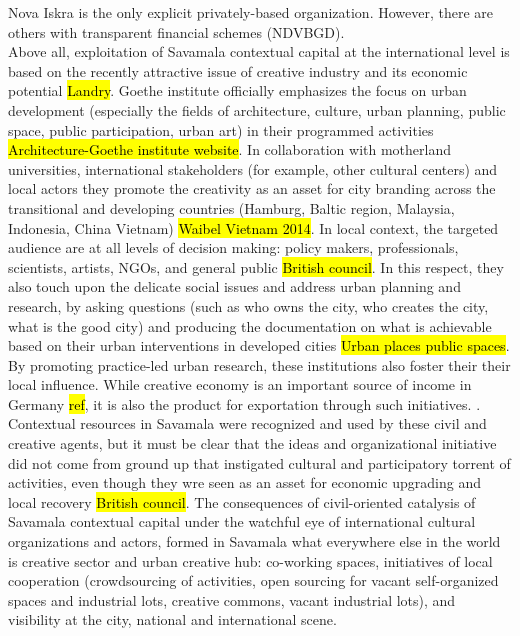 \documentclass[11pt]{report}
\begin{document}
Nova Iskra is the only explicit privately-based organization.
However, there are others with transparent financial schemes (NDVBGD).
\\
Above all, exploitation of Savamala contextual capital at the international level is based on the recently attractive issue of creative industry and its economic potential \hl{Landry}.
Goethe institute officially emphasizes the focus on urban development (especially the fields of architecture, culture, urban planning, public space, public participation, urban art) in their programmed activities \hl{Architecture-Goethe institute website}.
In collaboration with motherland universities, international stakeholders (for example, other cultural centers) and local actors they promote the creativity as an asset for city branding across the transitional and developing countries (Hamburg, Baltic region, Malaysia, Indonesia, China Vietnam) \hl{Waibel Vietnam 2014}.
In local context, the targeted audience are at all levels of decision making: policy makers, professionals, scientists, artists, NGOs, and general public \hl{British council}.
In this respect, they also touch upon the delicate social issues and address urban planning and research, by asking questions (such as who owns the city, who creates the city, what is the good city) and producing the documentation on what is achievable based on their urban interventions in developed cities \hl{Urban places public spaces}.
By promoting practice-led urban research, these institutions also foster their their local influence.
While creative economy is an important source of income in Germany \hl{ref}, it is also the product for exportation through such initiatives. \footnotemark.
\\
Contextual resources in Savamala were recognized and used by these civil and creative agents, but it must be clear that the ideas and organizational initiative  did not come from ground up that instigated cultural and participatory torrent of activities, even though they wre seen as an asset for economic upgrading and local recovery \hl{British council}.
The consequences of civil-oriented catalysis of Savamala contextual capital under the watchful eye of international cultural organizations and actors, formed in Savamala what everywhere else in the world is creative sector and urban creative hub: co-working spaces, initiatives of local cooperation (crowdsourcing of activities, open sourcing for vacant self-organized spaces and industrial lots, creative commons, vacant industrial lots), and visibility at the city, national and international scene.
\end{document}
